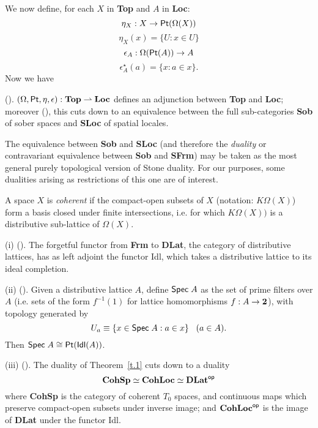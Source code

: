We now define, for each $X$ in {\bf Top} and $A$ in {\bf Loc}:
\[ \eta_{X} : X \rightarrow {\sf Pt}( \Omega (X)) \]
\[ \eta_{X}(x) = \{ U : x \in U \} \]
\[ \epsilon_{A} : \Omega ({\sf Pt}(A)) \rightarrow A \]
\[ \epsilon_{A}^{\star}(a) = \{ x : a \in x \} . \]
Now we have
\begin{theorem}
\label{t.1}
(\cite[II.2.4]{Joh82}). $(\Omega , {\sf Pt}, \eta , \epsilon ) : {\bf Top} 
\rightharpoonup {\bf Loc}$ defines an adjunction between {\bf Top} and 
{\bf Loc}; moreover (\cite[II.2.7]{Joh82}), this cuts down to an equivalence between the full sub-categories {\bf Sob} of sober spaces and {\bf SLoc} of spatial locales.
\end{theorem}
The equivalence between {\bf Sob} and {\bf SLoc} (and therefore the {\em duality} or contravariant equivalence between {\bf Sob} and {\bf SFrm}) may be taken as the most general purely topological version of Stone duality.
For our purposes, some  dualities arising as restrictions of this one are of interest.
\begin{definition}
{\rm A space $X$ is {\em coherent} if the compact-open subsets of $X$ 
(notation: $K \Omega (X)$) form a basis closed under finite intersections, i.e. for which $K \Omega (X))$ is a distributive sub-lattice of $\Omega (X)$.
}
\end{definition}
\begin{theorem}
\label{t.2}
(i) (\cite[II.2.11]{Joh82}). The forgetful functor from {\bf Frm} to {\bf DLat}, the category of distributive lattices, has as left adjoint the functor {\sf Idl}, which takes a distributive lattice to its ideal completion.

\noindent (ii) (\cite[II.3.4]{Joh82}). Given a distributive lattice $A$, define ${\sf Spec} \; A$ as the set of prime filters over $A$ (i.e. sets of the form $f^{-1}(1)$ for lattice homomorphisms $f : A \rightarrow {\bf 2}$), with topology generated by
\[ U_{a} \equiv \{ x \in {\sf Spec} \; A : a \in x \} \;\;\; (a \in A). \]
Then ${\sf Spec} \; A \cong {\sf Pt}({\sf Idl}(A))$.

\noindent (iii) (\cite[II.3.3]{Joh82}). The duality of Theorem~\ref{t.1} cuts down to a duality
\[ {\bf CohSp} \simeq {\bf CohLoc} \simeq {\bf DLat}^{\sf op} \]
where {\bf CohSp} is the category of coherent $T_{0}$ spaces, and continuous maps which preserve compact-open subsets under inverse image; 
and ${\bf CohLoc}^{\sf op}$ is the image of {\bf DLat} under the functor {\sf Idl}.
\end{theorem}

